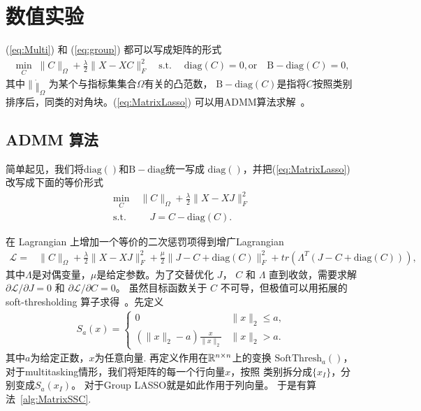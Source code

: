 \documentclass[main.tex]{subfiles}
\begin{document}
\chapter{数值实验}\label{chp:experiments}

(\ref{eq:Multi}) 和 (\ref{eq:group}) 都可以写成矩阵的形式
\begin{align}\label{eq:MatrixLasso}
  \min_{C} \; \|C\|_{\Omega}+\frac{\lambda}{2}\|X-XC\|_F^2 \quad
  \text{s.t.} \;\quad\mathrm{diag}(C)=0, \text{or} \quad \mathrm{B-diag}(C)=0,
\end{align}
其中$\|\dot\|_{\Omega}$ 为某个与指标集集合$\Omega$有关的凸范数，
$\mathrm{B-diag}(C)$是指将$C$按照类别排序后，同类的对角块。(\ref{eq:MatrixLasso})
可以用ADMM算法求解~\cite{boyd2011admm}。
\section{ADMM 算法}
简单起见，我们将$\mathrm{diag}()$和$\mathrm{B-diag}$统一写成
$\mathrm{diag}()$，并把(\ref{eq:MatrixLasso})改写成下面的等价形式
\begin{align}\label{eq:MatrixLasso_modify}
  \min_{C} \; &\|C\|_{\Omega}+\frac{\lambda}{2}\|X-XJ\|_F^2 \\
  \text{s.t.} \;&\quad J=C-\mathrm{diag}(C).
\end{align}

在 Lagrangian 上增加一个等价的二次惩罚项得到增广Lagrangian
\begin{align*}
  \mathcal{L}=& \|C\|_{\Omega}+\frac{\lambda}{2}\|X-XJ\|_F^2 
  + \frac{\mu}{2}\|J-C+\mathrm{diag}(C)\|_F^2
  +tr(\Lambda^T(J-C+\mathrm{diag}(C))),
\end{align*}
其中$\Lambda$是对偶变量，$\mu$是给定参数。为了交替优化
$J$， $C$ 和 $\Lambda$ 直到收敛，需要求解 $\partial \mathcal{L}/\partial J=0$
和 $\partial \mathcal{L}/\partial C=0$。
虽然目标函数关于 $C$ 不可导，但极值可以用拓展的 soft-thresholding
算子求得~\cite{donoho1995noising}。先定义
\begin{align*}
  S_a(x) = \begin{cases}
    \mathrm{0} & \|x\|_2 \le a, \\
    (\|x\|_2 - a) \frac{x}{\|x\|_2} & \|x\|_2 > a.
  \end{cases}
\end{align*}
其中$a$为给定正数，$x$为任意向量.
再定义作用在$\mathbb{R}^{n\times n}$上的变换
$\mathrm{SoftThresh}_a()$，
对于multitasking情形，我们将矩阵的每一个行向量$x$，按照
类别拆分成$\{x_I\}$，分别变成$S_a(x_I)$。
对于Group LASSO就是如此作用于列向量。
于是有算法~\ref{alg:MatrixSSC}.
\end{document}
